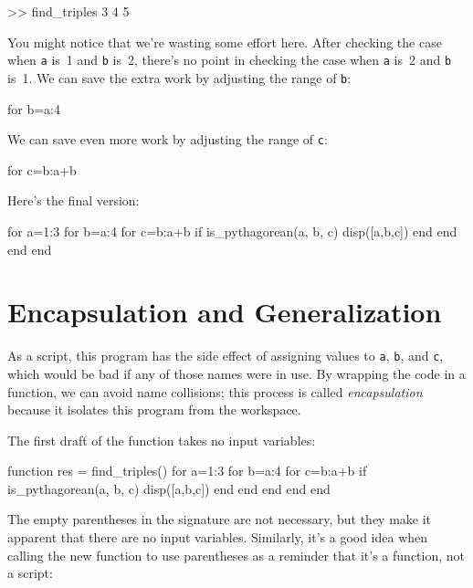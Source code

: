 \begin{code}
>> find_triples
     3     4     5
\end{code}

You might notice that we're wasting some effort here.
After checking the case when \lstinline{a} is~1 and \lstinline{b} is~2, there's no point in checking
the case when \lstinline{a} is~2 and \lstinline{b} is~1.  We can save the extra work by adjusting the
range of \lstinline{b}:

\begin{code}
for b=a:4
\end{code}

We can save even more work by adjusting the range of \lstinline{c}:

\begin{code}
for c=b:a+b
\end{code}

Here's the final version:

\begin{code}
for a=1:3
    for b=a:4
        for c=b:a+b
            if is_pythagorean(a, b, c)
                disp([a,b,c])
            end
        end
    end
end
\end{code}

\section{Encapsulation and Generalization}

As a script, this program has the side effect of assigning values to
\lstinline{a}, \lstinline{b}, and \lstinline{c}, which would be bad if any of those names were in use.  
By wrapping the code in a function, we can avoid name collisions; this process is called \emph{encapsulation} because it isolates this program from the workspace.


The first draft of the function takes no input variables:

\begin{code}
function res = find_triples()
    for a=1:3
        for b=a:4
            for c=b:a+b
                if is_pythagorean(a, b, c)
                    disp([a,b,c])
                end
            end
        end
    end
end
\end{code}

The empty parentheses in the signature are not necessary, but
they make it apparent that there are no input variables.  Similarly,
it's a good  idea when calling the new function to use parentheses as a reminder
that it's a function, not a script:

